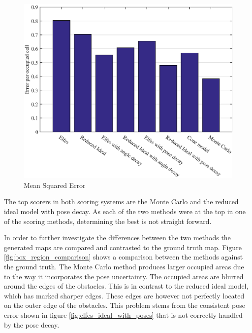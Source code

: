 
\begin{figure}[htbp]
	\centering
	\includegraphics[scale=1]{figures/static_mapping/comparison_obstacle_error_per_cell}
	\caption{Mean Squared Error}
	\label{fig:comparison_obstacle_error_per_cell}
\end{figure}

The top scorers in both scoring systems are the Monte Carlo and the reduced ideal model with pose decay. As each of the two methods were at the top in one of the scoring methods, determining the best is not straight forward.

In order to further investigate the differences between the two methods the generated maps are compared and contrasted to the ground truth map. 
Figure \vref{fig:box_region_comparison} shows a comparison between the methods against the ground truth.
The Monte Carlo method produces larger occupied areas due to the way it incorporates the pose uncertainty. The occupied areas are blurred around the edges of the obstacles. 
This is in contrast to the reduced ideal model, which has marked sharper edges. 
These edges are however not perfectly located on the outer edge of the obstacles. 
This problem stems from the consistent pose error shown in figure \ref{fig:elfes_ideal_with_poses} that is not correctly handled by the pose decay. 


